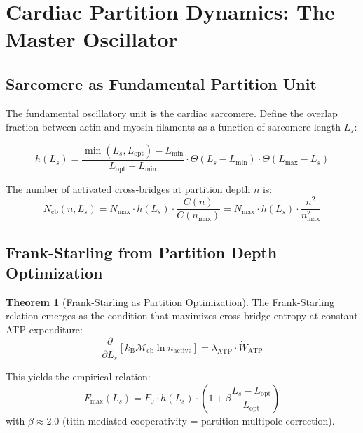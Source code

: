 \documentclass[12pt,a4paper]{article}
\theoremstyle{definition}
\newtheorem{theorem}{Theorem}
\newcommand{\kB}{k_{\text{B}}}
\begin{document}
\section{Cardiac Partition Dynamics: The Master Oscillator}
\label{sec:cardiac}

\subsection{Sarcomere as Fundamental Partition Unit}

The fundamental oscillatory unit is the cardiac sarcomere. Define the
overlap fraction between actin and myosin filaments as a function of
sarcomere length $L_s$:

\begin{equation}
h(L_s) = \frac{\min(L_s, L_{\text{opt}}) - L_{\min}}{L_{\text{opt}} - L_{\min}}
\cdot \Theta(L_s - L_{\min}) \cdot \Theta(L_{\max} - L_s)
\end{equation}

The number of activated cross-bridges at partition depth $n$ is:
\begin{equation}
N_{\text{cb}}(n, L_s) = N_{\max} \cdot h(L_s) \cdot \frac{C(n)}{C(n_{\max})}
= N_{\max} \cdot h(L_s) \cdot \frac{n^2}{n_{\max}^2}
\end{equation}

\subsection{Frank-Starling from Partition Depth Optimization}

\begin{theorem}[Frank-Starling as Partition Optimization]
The Frank-Starling relation emerges as the condition that maximizes cross-bridge
entropy at constant ATP expenditure:
\begin{equation}
\boxed{\frac{\partial}{\partial L_s}\left[\kB \mathcal{M}_{\text{cb}} \ln n_{\text{active}}\right]
= \lambda_{\text{ATP}} \cdot \dot{W}_{\text{ATP}}}
\end{equation}
\end{theorem}

This yields the empirical relation:
\begin{equation}
F_{\max}(L_s) = F_0 \cdot h(L_s) \cdot \left(1 + \beta \frac{L_s - L_{\text{opt}}}{L_{\text{opt}}}\right)
\end{equation}
with $\beta \approx 2.0$ (titin-mediated cooperativity = partition multipole correction).
\end{document}
